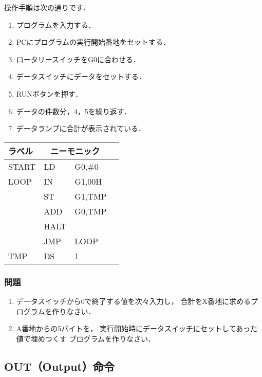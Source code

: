 操作手順は次の通りです．

\begin{enumerate}
\item プログラムを入力する．
\item PCにプログラムの実行開始番地をセットする．
\item ロータリースイッチをG0に合わせる．
\item データスイッチにデータをセットする．
\item RUNボタンを押す．
\item データの件数分，4，5を繰り返す．
\item データランプに合計が表示されている．
\end{enumerate}

{\ttfamily\small\begin{center}
  \begin{tabular}{|l|l l|l}
    \cline{1-3}
    ラベル & \multicolumn{2}{|c|}{ニーモニック} \\
    \hline
    START & LD   & G0,\#0        \\
    LOOP  & IN   & G1,00H        \\
    & ST   & G1,TMP        \\
    & ADD  & G0,TMP        \\
    & HALT &               \\
    & JMP  & LOOP          \\ 
TMP & DS   & 1             \\ 
    \hline
  \end{tabular}
\end{center}}

\vfill
\subsubsection{問題}
\begin{enumerate}
\item データスイッチから0で終了する値を次々入力し，
  合計をX番地に求めるプログラムを作りなさい．
\item A番地からの5バイトを，
  実行開始時にデータスイッチにセットしてあった値で埋めつくす
  プログラムを作りなさい．
\end{enumerate}
\vfill

\subsection{OUT（Output）命令}
\label{out}

